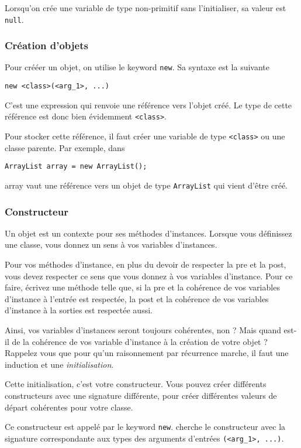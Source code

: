 Lorsqu'on crée une variable de type non-primitif
sans l'initialiser, sa valeur est \lstinline{null}.

\subsubsection{Création d'objets}
Pour crééer un objet, on utilise le keyword \lstinline{new}.
Sa syntaxe est la suivante
\begin{lstlisting}
new <class>(<arg_1>, ...)
\end{lstlisting}
C'est une expression qui renvoie une référence vers l'objet créé.
Le type de cette référence est donc bien évidemment \lstinline{<class>}.

Pour stocker cette référence,
il faut créer une variable de type \lstinline{<class>}
ou une classe parente.
Par exemple, dans
\begin{lstlisting}
ArrayList array = new ArrayList();
\end{lstlisting}
array vaut une référence vers un objet de type \lstinline|ArrayList|
qui vient d'être créé.

\subsubsection{Constructeur}
Un objet est un contexte pour ses méthodes d'instances.
Lorsque vous définissez une classe, vous donnez un sens à vos variables
d'instances.

Pour vos méthodes d'instance,
en plus du devoir de respecter la pre et la post, vous devez respecter ce
sens que vous donnez à vos variables d'instance.
Pour ce faire,
écrivez une méthode telle que, si la pre et la cohérence de vos variables
d'instance à l'entrée est respectée,
la post et la cohérence de vos variables d'instance
à la sorties est respectée aussi.

Ainsi, vos variables d'instances seront toujours cohérentes, non ?
Mais quand est-il de la cohérence de vos variable d'instance à la création
de votre objet ?
Rappelez vous que pour qu'un raisonnement par récurrence marche, il faut
une induction et une \emph{initialisation}.

Cette initialisation, c'est votre constructeur.
Vous pouvez créer différents constructeurs avec une signature différente,
pour créer différentes valeurs de départ cohérentes pour votre classe.

Ce constructeur est appelé par le keyword \lstinline|new|.
\java{} cherche le constructeur avec la signature correspondante aux
types des arguments d'entrées \lstinline|(<arg_1>, ...)|.

